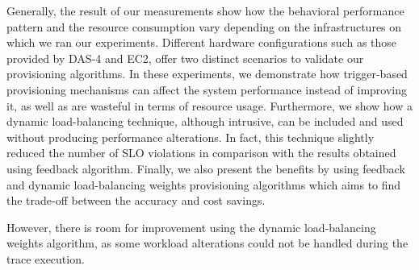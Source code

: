 Generally, the result of our measurements show how the behavioral performance pattern and the resource consumption vary depending on the infrastructures on which we ran our experiments. Different hardware configurations such as those provided by DAS-4 and EC2, offer two distinct scenarios to validate our provisioning algorithms.  In these experiments, we demonstrate how trigger-based provisioning mechanisms can affect the system performance instead of improving it, as well as are wasteful in terms of resource usage. Furthermore, we show how a dynamic load-balancing technique, although intrusive, can be included and used without producing performance alterations. In fact, this technique slightly reduced the number of SLO violations in comparison with the results obtained using feedback algorithm. Finally, we also present the benefits by using feedback and dynamic load-balancing weights provisioning algorithms which aims to find the trade-off between the accuracy and cost savings. 

However, there is room for improvement using the dynamic load-balancing weights algorithm, as some  workload alterations could not be handled during the trace execution.





